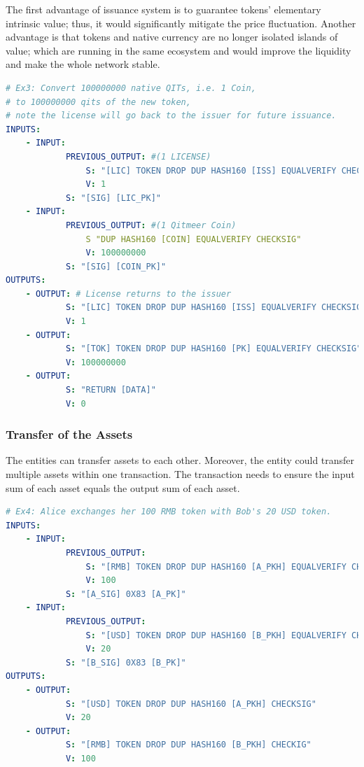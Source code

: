 \documentclass[a4paper,11pt]{article}
\begin{document}
The first advantage of issuance system is to guarantee tokens’ elementary intrinsic value; thus, it would significantly mitigate the price fluctuation. Another advantage is that tokens and native currency are no longer isolated islands of value; which are running in the same ecosystem and would improve the liquidity and make the whole network stable.

\lstset{basicstyle=\tiny,style=myListStyle}
\begin{lstlisting}[language=yaml, numbers=none,basicstyle=\footnotesize]
# Ex3: Convert 100000000 native QITs, i.e. 1 Coin,
# to 100000000 qits of the new token,
# note the license will go back to the issuer for future issuance.
INPUTS:
	- INPUT:
			PREVIOUS_OUTPUT: #(1 LICENSE)
				S: "[LIC] TOKEN DROP DUP HASH160 [ISS] EQUALVERIFY CHECKSIG"
				V: 1
			S: "[SIG] [LIC_PK]"
	- INPUT:
			PREVIOUS_OUTPUT: #(1 Qitmeer Coin)
				S "DUP HASH160 [COIN] EQUALVERIFY CHECKSIG"
				V: 100000000
			S: "[SIG] [COIN_PK]"
OUTPUTS:
	- OUTPUT: # License returns to the issuer
			S: "[LIC] TOKEN DROP DUP HASH160 [ISS] EQUALVERIFY CHECKSIG"
			V: 1
	- OUTPUT:
			S: "[TOK] TOKEN DROP DUP HASH160 [PK] EQUALVERIFY CHECKSIG"
			V: 100000000
	- OUTPUT:
			S: "RETURN [DATA]"
			V: 0
\end{lstlisting}

\subsubsection{Transfer of the Assets}

The entities can transfer assets to each other. Moreover, the entity could transfer multiple assets within one transaction. The transaction needs to ensure the input sum of each asset equals the output sum of each asset.

\lstset{basicstyle=\tiny,style=myListStyle}
\begin{lstlisting}[language=yaml, numbers=none,basicstyle=\footnotesize]
# Ex4: Alice exchanges her 100 RMB token with Bob's 20 USD token.
INPUTS:
	- INPUT:
			PREVIOUS_OUTPUT:
				S: "[RMB] TOKEN DROP DUP HASH160 [A_PKH] EQUALVERIFY CHECKSIG"
				V: 100
			S: "[A_SIG] 0X83 [A_PK]"
	- INPUT:
			PREVIOUS_OUTPUT:
				S: "[USD] TOKEN DROP DUP HASH160 [B_PKH] EQUALVERIFY CHECKSIG"
				V: 20
			S: "[B_SIG] 0X83 [B_PK]"
OUTPUTS:
	- OUTPUT:
			S: "[USD] TOKEN DROP DUP HASH160 [A_PKH] CHECKSIG"
			V: 20
	- OUTPUT:
			S: "[RMB] TOKEN DROP DUP HASH160 [B_PKH] CHECKIG"
			V: 100
\end{lstlisting}
\end{document}
